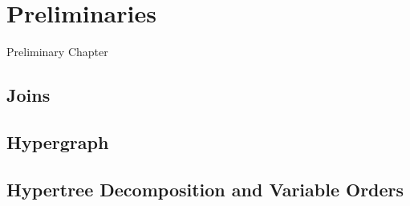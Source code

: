 \chapter{Preliminaries}

Preliminary Chapter

\section{Joins}
\section{Hypergraph}
\section{Hypertree Decomposition and Variable Orders}
